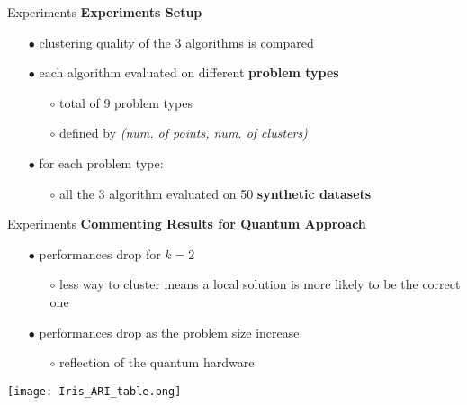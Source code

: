 		\begin{frame}{Experiments}
			\textbf{Experiments Setup}
			\begin{itemize}
				\item[$\bullet$] clustering quality of the 3 algorithms is compared
				\item[$\bullet$] each algorithm evaluated on different \textbf{problem types}
				\begin{itemize}
					\item[$\circ$] total of 9 problem types 
					\item[$\circ$] defined by \textit{(num. of points, num. of clusters)}
				\end{itemize}
				\item[$\bullet$] for each problem type:
				\begin{itemize}
					\item[$\circ$]  all the 3 algorithm evaluated on 50 \textbf{synthetic datasets}
				\end{itemize}

			\end{itemize}
			
		\end{frame}

		\begin{frame}{Experiments}
			\textbf{Commenting Results for Quantum Approach}
			\begin{itemize}
				\item[$\bullet$] performances drop for $k=2$
				\begin{itemize}
					\item[$\circ$] less way to cluster means a local solution is more likely to be the correct one
				\end{itemize}
				\item[$\bullet$] performances drop as the problem size increase 
				\begin{itemize}
					\item[$\circ$] reflection of the quantum hardware
				\end{itemize}
			\end{itemize}

			\begin{center}
				\texttt{[image: Iris\_ARI\_table.png]}
			\end{center}
		\end{frame}

